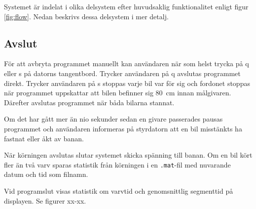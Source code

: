 Systemet är indelat i olika delsystem efter huvudsaklig funktionalitet enligt figur
\ref{fig:flow}. Nedan beskrivs dessa delsystem i mer detalj.






\subsection{Avslut}

För att avbryta programmet manuellt kan användaren när som helst trycka på q
eller s på datorns tangentbord. Trycker användaren på q avslutas programmet
direkt. Trycker användaren på s stoppas varje bil var för sig och fordonet
stoppas när programmet uppskattar att bilen befinner sig 80~cm innan målgivaren.
Därefter avslutas programmet när båda bilarna stannat.

Om det har gått mer än nio sekunder sedan en givare passerades pausas programmet
och användaren informeras på styrdatorn att en bil misstänkts ha fastnat eller
åkt av banan. 

När körningen avslutas slutar systemet skicka spänning till banan.
Om en bil kört fler än två varv sparas statistik från körningen i en
\texttt{.mat}-fil med nuvarande datum och tid som filnamn.

Vid programslut visas statistik om varvtid och genomsnittlig segmenttid på
displayen. Se figurer xx-xx.

